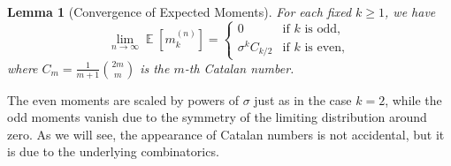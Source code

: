 \documentclass[letterpaper,11pt,oneside,reqno]{article}
\numberwithin{equation}{section}
\newtheorem{lemma}[proposition]{Lemma}
\theoremstyle{definition}
\begin{document}
\begin{lemma}[Convergence of Expected Moments]
\label{lemma:moments_convergence}
For each fixed $k \geq 1$, we have
\[
\lim_{n \to \infty} \operatorname{\mathbb{E}}[m_k^{(n)}] =
\begin{cases}
0 & \text{if $k$ is odd}, \\
\sigma^k C_{k/2} & \text{if $k$ is even},
\end{cases}
\]
where $C_m = \frac{1}{m+1}\binom{2m}{m}$ is the $m$-th Catalan number.
\end{lemma}

The even moments are scaled by powers of $\sigma$ just as in the case $k=2$,
while the odd moments vanish due to the symmetry of the limiting distribution
around zero.
As we will see, the appearance of Catalan numbers is not accidental,
but it is due to the underlying combinatorics.
\end{document}
